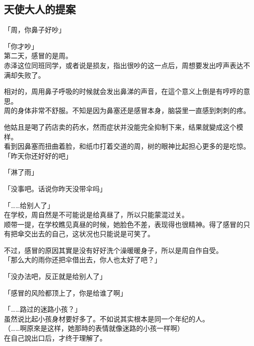 \subsection{天使大人的提案}

「周，你鼻子好吵」

「你才吵」\\

第二天，感冒的是周。\\

赤泽这位同班同学，或者说是损友，指出很吵的这一点后，周想要发出哼声表达不满却失败了。

相对的，周用鼻子呼吸的时候就会发出鼻涕的声音，在這个意义上倒是有哼哼的意思。\\

周的身体非常不舒服。不知是因为鼻塞还是感冒本身，脑袋里一直感到刺刺的疼。

他姑且是喝了药店卖的药水，然而症状并没能完全抑制下来，结果就變成这个模样。\\

看到因鼻塞而扭曲着脸，和纸巾打着交道的周，树的眼神比起担心更多的是吃惊。\\

「昨天你还好好的吧」

「淋了雨」

「没事吧。话说你昨天没带伞吗」

「……给别人了」\\

在学校，周自然是不可能说是给真昼了，所以只能蒙混过关。\\

顺带一提，在学校瞧见真昼的时候，她脸色不差，表现得也很精神。得了感冒的只有把傘交出去的自己，这状况也只能说是可笑了。

不过，感冒的原因其實是没有好好洗个澡暖暖身子，所以是周自作自受。\\

「那么大的雨你还把伞借出去，你人也太好了吧？」

「没办法吧，反正就是给别人了」

「感冒的风险都顶上了，你是给谁了啊」

「……路过的迷路小孩？」\\

虽然说比起小孩身材要好多了。不如说其实根本是同一个年纪的人。\\

（……啊原來是这样，她那時的表情就像迷路的小孩一样啊）\\

在自己說出口后，才终于理解了。

